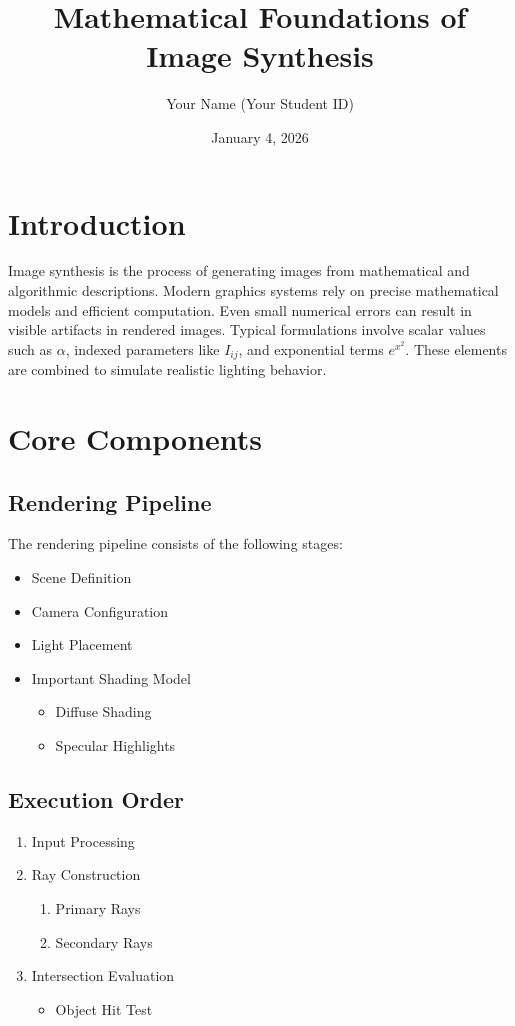 \documentclass[11pt]{article}
\title{Mathematical Foundations of Image Synthesis}
\author{Your Name (Your Student ID)}
\date{January 4, 2026}
\begin{document}
\maketitle

\section{Introduction}
Image synthesis is the process of generating images from mathematical and algorithmic descriptions. Modern graphics systems rely on precise mathematical models and efficient computation. Even small numerical errors can result in visible artifacts in rendered images. Typical formulations involve scalar values such as $\alpha$, indexed parameters like $I_{ij}$, and exponential terms $e^{x^{2}}$. These elements are combined to simulate realistic lighting behavior.

\section{Core Components}

\subsection{Rendering Pipeline}
The rendering pipeline consists of the following stages:
\begin{itemize}
    \item Scene Definition
    \item Camera Configuration
    \item Light Placement
    \item Important Shading Model
    \begin{itemize}
        \item Diffuse Shading
        \item Specular Highlights
    \end{itemize}
\end{itemize}

\subsection{Execution Order}
\begin{enumerate}
    \item Input Processing
    \item Ray Construction
    \begin{enumerate}
        \item[(a)] Primary Rays
        \item[(b)] Secondary Rays
    \end{enumerate}
    \item Intersection Evaluation
    \begin{itemize}
        \item Object Hit Test
    \end{itemize}
\end{enumerate}
\end{document}
